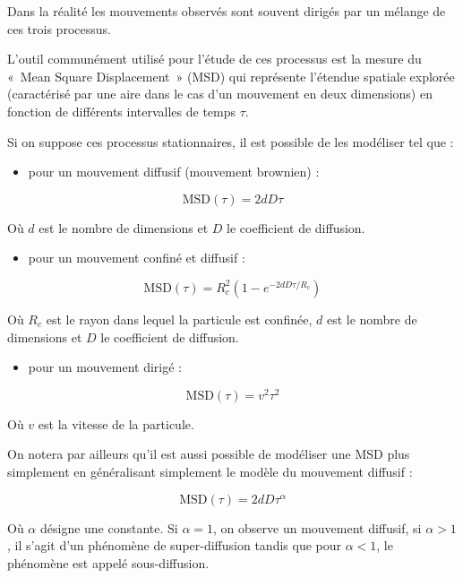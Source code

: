 \documentclass[12pt,a4paper,twoside,openright]{book}
\providecommand{\tightlist}{%
  \setlength{\itemsep}{0pt}\setlength{\parskip}{0pt}}
\begin{document}
Dans la réalité les mouvements observés sont souvent dirigés par un
mélange de ces trois processus.

L'outil communément utilisé pour l'étude de ces processus est la mesure
du «~Mean Square Displacement~» (MSD) qui représente l'étendue spatiale
explorée (caractérisé par une aire dans le cas d'un mouvement en deux
dimensions) en fonction de différents intervalles de temps \(\tau\).

Si on suppose ces processus stationnaires, il est possible de les
modéliser tel que :

\begin{itemize}
\tightlist
\item
  pour un mouvement diffusif (mouvement brownien) :
\end{itemize}

\[
\mbox{MSD}(\tau) = 2dD\tau
\]

Où \(d\) est le nombre de dimensions et \(D\) le coefficient de
diffusion.

\begin{itemize}
\tightlist
\item
  pour un mouvement confiné et diffusif :
\end{itemize}

\[
\mbox{MSD}(\tau) = R_c^2(1-e^{-2dD\tau / R_c})
\]

Où \(R_c\) est le rayon dans lequel la particule est confinée, \(d\) est
le nombre de dimensions et \(D\) le coefficient de diffusion.

\begin{itemize}
\tightlist
\item
  pour un mouvement dirigé :
\end{itemize}

\[
\mbox{MSD}(\tau) = v^2\tau ^2
\]

Où \(v\) est la vitesse de la particule.

On notera par ailleurs qu'il est aussi possible de modéliser une MSD
plus simplement en généralisant simplement le modèle du mouvement
diffusif :

\[
\mbox{MSD}(\tau) = 2dD\tau ^ {\alpha}
\]

Où \(\alpha\) désigne une constante. Si \(\alpha = 1\), on observe un
mouvement diffusif, si \(\alpha > 1\), il s'agit d'un phénomène de
super-diffusion tandis que pour \(\alpha < 1\), le phénomène est appelé
sous-diffusion.
\end{document}
